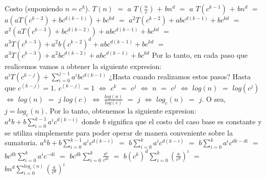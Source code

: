 \documentclass[10pt,a4paper]{article}
\begin{document}
Costo (suponiendo $n = c^{k}$).
\newline
\newline
$T(n)$ $=$ $a$ $T(\displaystyle \frac{n}{c})$ $+$ $b n^{d}$ $=$ $a$ $T(c^{k-1})$ $+$ $b n^{d}$
\newline
\newline
$=$ $a(aT(c^{k-2}) + b c^{d(k-1)}) + bc^{kd}$ $=$ $a^{2}T(c^{k-2}) + abc^{d(k-1)} + bc^{kd}$ 
\newline
\newline
$=$ $a^{2}(aT(c^{k-3}) + b c^{d(k-2)}) + abc^{d(k-1)} + bc^{kd}$ 
\newline
\newline
$=$ $a^{3} T(c^{k-3}) + a^{2}b(c^{k-2})^{d} + abc^{d(k-1)} + bc^{kd}$ 
\newline
\newline
$=$ $a^{3} T(c^{k-3}) + a^{2}bc^{d(k-2)} + abc^{d(k-1)} + bc^{kd}$ 
\newline
\newline
Por lo tanto, en cada paso que realicemos vamos a obtener la siguiente expresion:
\newline
\newline
$a^{i} T(c^{k-j}) + \displaystyle \sum_{i=0}^{j-1} a^{i}bc^{d(k-1)}$
\newline
\newline
¿Hasta cuando realizamos estos pasos? Hasta que $c^{(k-j)} = 1$.
\newline
\newline
$c^{(k-j)} = 1$ $\Leftrightarrow$ $c^{k}$ $=$ $c^{j}$ $\Leftrightarrow$ $n$ $=$ $c^{j}$ $\Leftrightarrow$ $log(n)$ $=$ $log(c^{j})$ $\Leftrightarrow$ $log(n)$ $=$ $j$ $log(c)$ $\Leftrightarrow$ $\displaystyle \frac{log(n)}{log(c)}$ $=$ $j$ $\Leftrightarrow$ $log_{c}(n)$ $=$ $j$.
\newline
\newline
O sea, $j = log_{c}(n)$. Por lo tanto, obtenemos la siguiente expresion:
\newline
\newline
$a^{k}b + b \displaystyle \sum_{i=0}^{k-1} a^{i}c^{d(k-i)}$ donde $b$ significa que el costo del caso base es constante y se utiliza simplemente para poder operar de manera conveniente sobre la sumatoria.
\newline
\newline
\newline
$a^{k}b + b \displaystyle \sum_{i=0}^{k-1} a^{i}c^{d(k-i)}$ $=$ $b \displaystyle \sum_{i=0}^{k} a^{i}c^{d(k-i)}$ $=$ $b \displaystyle \sum_{i=0}^{k} a^{i}c^{dk-di}$ $=$ $bc^{dk} \displaystyle \sum_{i=0}^{k} a^{i}c^{-di}$ $=$ $bc^{dk} \displaystyle \sum_{i=0}^{k} \displaystyle \frac{a^{i}}{c^{di}}$ $=$ $b(c^{k})^{d} \displaystyle \sum_{i=0}^{k} (\displaystyle \frac{a}{c^{d}})^{i}$ $=$ $bn^{d} \displaystyle \sum_{i=0}^{log_{c}(n)} (\displaystyle \frac{a}{c^{d}})^{i}$
\end{document}
